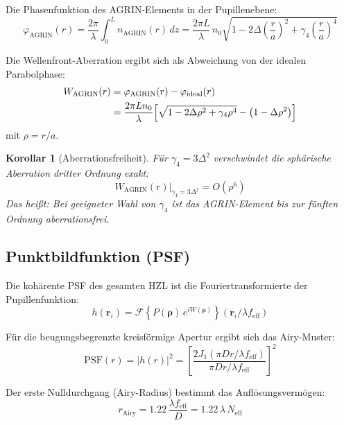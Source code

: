 ﻿\documentclass[12pt,a4paper]{article}
\newtheorem{korollar}[theorem]{Korollar}
\theoremstyle{definition}
\newcommand{\eff}{\mathrm{eff}}
\newcommand{\AGRIN}{\mathrm{AGRIN}}
\newcommand{\PSF}{\mathrm{PSF}}
\renewcommand{\abs}[1]{\left|#1\right|}
\begin{document}
	Die Phasenfunktion des AGRIN-Elements in der Pupillenebene:
	\begin{equation}
		\varphi_\AGRIN(r) = \frac{2\pi}{\lambda}\int_0^L n_\AGRIN(r)\,dz
		= \frac{2\pi L}{\lambda}\,n_0\sqrt{1 - 2\Delta\!\left(\frac{r}{a}\right)^{\!2}
			+ \gamma_4\!\left(\frac{r}{a}\right)^{\!4}}
		\label{eq:phase_agrin}
	\end{equation}
	
	Die Wellenfront-Aberration ergibt sich als Abweichung von der idealen Parabolphase:
	\begin{align}
		W_\AGRIN(r) &= \varphi_\AGRIN(r) - \varphi_\mathrm{ideal}(r) \notag\\
		&= \frac{2\pi L n_0}{\lambda}\!\left[
		\sqrt{1 - 2\Delta\rho^2 + \gamma_4\rho^4}
		- \left(1 - \Delta\rho^2\right)\right]
		\label{eq:wavefront}
	\end{align}
	mit $\rho = r/a$.
	
	\begin{korollar}[Aberrationsfreiheit]
		Für $\gamma_4 = 3\Delta^2$ verschwindet die sphärische Aberration dritter
		Ordnung exakt:
		\begin{equation}
			W_\AGRIN(r)\big|_{\gamma_4 = 3\Delta^2}
			= O\!\left(\rho^6\right)
		\end{equation}
		Das heißt: Bei geeigneter Wahl von $\gamma_4$ ist das AGRIN-Element
		bis zur fünften Ordnung aberrationsfrei.
	\end{korollar}
	
	\subsection{Punktbildfunktion (PSF)}
	
	Die kohärente PSF des gesamten HZL ist die Fouriertransformierte der
	Pupillenfunktion:
	\begin{equation}
		h(\mathbf{r}_i) = \mathcal{F}\!\left\{P(\boldsymbol{\rho})\,
		e^{i W(\boldsymbol{\rho})}\right\}(\mathbf{r}_i / \lambda f_\eff)
		\label{eq:psf_coherent}
	\end{equation}
	
	Für die beugungsbegrenzte kreisförmige Apertur ergibt sich das Airy-Muster:
	\begin{equation}
		\PSF(r) = \abs{h(r)}^2
		= \left[\frac{2J_1\!\left(\pi D r / \lambda f_\eff\right)}
		{\pi D r / \lambda f_\eff}\right]^{\!2}
		\label{eq:airy}
	\end{equation}
	
	Der erste Nulldurchgang (Airy-Radius) bestimmt das Auflösungsvermögen:
	\begin{equation}
		r_\mathrm{Airy} = 1.22\,\frac{\lambda f_\eff}{D}
		= 1.22\,\lambda\,N_\eff
		\label{eq:airy_radius}
	\end{equation}
	
\end{document}
